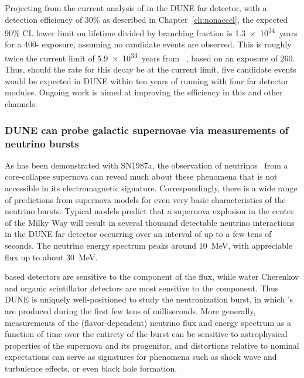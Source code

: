 Projecting from the current analysis of \ptoknubar in the DUNE 
far detector, with a detection efficiency of \num{30}\% as described in Chapter~\ref{ch:nonaccel}, the 
expected 90\% CL lower limit on lifetime divided by branching 
fraction is \SI{1.3e34}{years} for a 
\num{400}-\SI{}{\ktyr} 
exposure, assuming no candidate events are observed.  This 
is roughly twice the current limit of 
\SI{5.9e33}{years} from \superk~\cite{Abe:2014mwa}, 
based on an exposure of \SI{260}{\ktyr}.  Thus, should the rate 
for this decay be at the current \superk limit, five candidate 
events would be expected in DUNE within ten years 
of running with four far detector modules.  Ongoing work is aimed 
at improving the efficiency in this and other channels.

\subsubsection{DUNE can probe galactic supernovae via measurements of neutrino bursts}

As has been demonstrated with SN1987a, the observation 
of neutrinos~\cite{Bionta:1987qt,Hirata:1987hu} from a 
core-collapse supernova can reveal much about these  
phenomena that is not accessible in its  
electromagnetic signature.  Correspondingly, there is a 
wide range of predictions from supernova models for even 
very basic characteristics of the neutrino bursts.  Typical  
models predict that a supernova explosion in the 
center of the Milky Way will result in several thousand 
detectable neutrino interactions in the DUNE far detector 
occurring over an interval of up to a few tens of seconds.
The neutrino energy spectrum peaks around \SI{10}{MeV}, 
with appreciable flux up to about \SI{30}{MeV}.

\lar based detectors are sensitive to the \nue 
component of the flux, while water Cherenkov and organic 
scintillator detectors are most sensitive to the \anue 
component.  Thus DUNE is uniquely well-positioned to study the 
neutronization burst, in which \nue's are produced during the 
first few tens of milliseconds.  More generally,  
measurements of the (flavor-dependent) neutrino flux and energy 
spectrum as a function of time over the entirety of the burst 
can be sensitive to astrophysical properties of the supernova 
and its progenitor, and distortions relative to nominal 
expectations can serve as signatures for phenomena such 
as shock wave and turbulence effects, or even black hole 
formation.  


